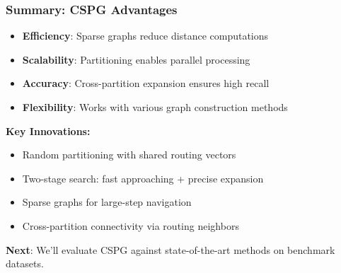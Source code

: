 \begin{frame}
\frametitle{Summary: CSPG Advantages}

\begin{itemize}
\item \textbf{Efficiency}: Sparse graphs reduce distance computations
\item \textbf{Scalability}: Partitioning enables parallel processing
\item \textbf{Accuracy}: Cross-partition expansion ensures high recall
\item \textbf{Flexibility}: Works with various graph construction methods
\end{itemize}

\vspace{5mm}
\textbf{Key Innovations:}
\begin{itemize}
\item Random partitioning with shared routing vectors
\item Two-stage search: fast approaching + precise expansion
\item Sparse graphs for large-step navigation
\item Cross-partition connectivity via routing neighbors
\end{itemize}

\vspace{5mm}
\textbf{Next}: We'll evaluate CSPG against state-of-the-art methods on benchmark datasets.
\end{frame}%
